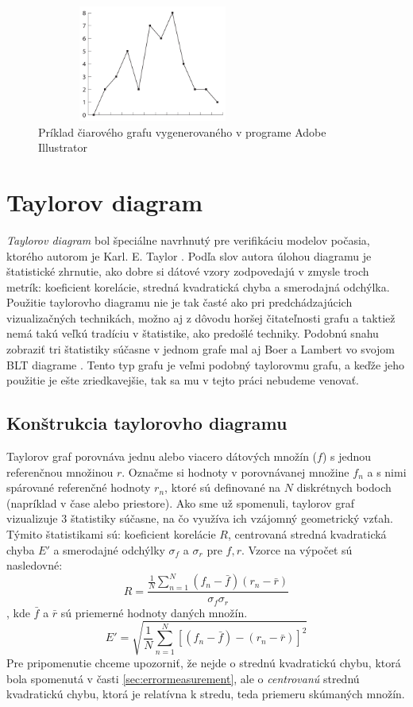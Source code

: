 \begin{figure}
	\centering
	\includegraphics[width = 3in, height=1.5in]{linegraph}
	\caption{Príklad čiarového grafu vygenerovaného v programe Adobe Illustrator}
	\label{fig:linegraph}
\end{figure}

\section{Taylorov diagram}
\textit{Taylorov diagram} bol špeciálne navrhnutý pre verifikáciu modelov počasia, ktorého autorom je Karl. E. Taylor \cite{Taylor}. Podľa slov autora úlohou diagramu je štatistické zhrnutie, ako dobre si dátové vzory zodpovedajú v zmysle troch metrík: koeficient korelácie, stredná kvadratická chyba a smerodajná odchýlka. Použitie taylorovho diagramu nie je tak časté ako pri predchádzajúcich vizualizačných technikách, možno aj z dôvodu horšej čitateľnosti grafu a taktiež nemá takú veľkú tradíciu v štatistike, ako predošlé techniky. Podobnú snahu zobraziť tri štatistiky súčasne v jednom grafe mal aj Boer a Lambert vo svojom BLT diagrame \cite{Boer}. Tento typ grafu je veľmi podobný taylorovmu grafu, a keďže jeho použitie je ešte zriedkavejšie, tak sa mu v tejto práci nebudeme venovať.
  
\subsection{Konštrukcia taylorovho diagramu}
Taylorov graf porovnáva jednu alebo viacero dátových množín ($ f $) s jednou referenčnou množinou $ r $. Označme si hodnoty v porovnávanej množine $ f_{n} $ a s nimi spárované referenčné hodnoty $ r_{n} $, ktoré sú definované na $ N $ diskrétnych bodoch (napríklad v čase alebo priestore). Ako sme už spomenuli, taylorov graf vizualizuje 3 štatistiky súčasne, na čo využíva ich vzájomný geometrický vzťah. Týmito štatistikami sú: koeficient korelácie $ R $, centrovaná stredná kvadratická chyba $ E' $ a smerodajné odchýlky $ \sigma_{f} $ a $ \sigma_{r} $ pre $ f, r $.  Vzorce na výpočet sú nasledovné:
\[
	R = \dfrac{\frac{1}{N} \sum_{n=1}^{N}(f_{n} - \bar{f})(r_{n} - \bar{r})  }{\sigma_{f}\sigma_{r}}
\]
, kde $ \bar{f} $ a $ \bar{r} $ sú priemerné hodnoty daných množín.
\[
	E' = \sqrt{\frac{1}{N} \sum_{n=1}^{N}[(f_{n} - \bar{f}) - (r_{n} - \bar{r})]^2 }
\]
Pre pripomenutie chceme upozorniť, že nejde o strednú kvadratickú chybu, ktorá bola spomenutá v časti \ref{sec:errormeasurement}, ale o \textit{centrovanú} strednú kvadratickú chybu, ktorá je relatívna k stredu, teda priemeru skúmaných množín.

